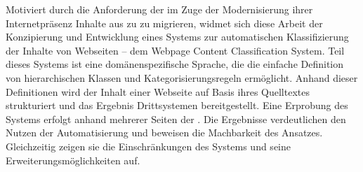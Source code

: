 Motiviert durch die Anforderung der {\fernUni} im Zuge der Modernisierung ihrer
Internetpräsenz Inhalte aus {\wordpress} zu {\imperia} zu migrieren,
widmet sich diese Arbeit der Konzipierung und Entwicklung eines Systems
zur automatischen Klassifizierung der Inhalte von Webseiten
-- dem Webpage Content Classification System.
Teil dieses Systems ist eine domänenspezifische Sprache, die die einfache
Definition von hierarchischen Klassen und Kategorisierungsregeln ermöglicht.
Anhand dieser Definitionen wird der Inhalt einer Webseite auf Basis ihres
Quelltextes strukturiert und das Ergebnis Drittsystemen bereitgestellt.
Eine Erprobung des Systems erfolgt anhand mehrerer Seiten der {\fernUni}.
Die Ergebnisse verdeutlichen den Nutzen der Automatisierung und
beweisen die Machbarkeit des Ansatzes.
Gleichzeitig zeigen sie die Einschränkungen des Systems und seine Erweiterungsmöglichkeiten auf.